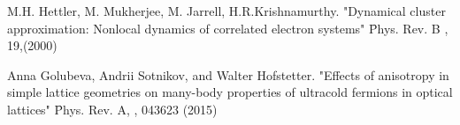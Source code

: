 \begin{thebibliography}{4}
{M.H. Hettler, M. Mukherjee, M. Jarrell, H.R.Krishnamurthy. "Dynamical cluster approximation: Nonlocal dynamics of correlated electron systems" \f{Phys. Rev. B} , 19,(2000)}

{Anna Golubeva, Andrii Sotnikov, and Walter Hofstetter. "Effects of anisotropy in simple lattice geometries on many-body properties of ultracold fermions in optical lattices" \f{Phys. Rev. A}, , 043623 (2015)} 

\end{thebibliography}

